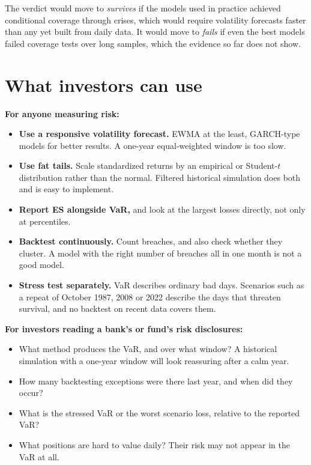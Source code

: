 The verdict would move to \emph{survives} if the models used in practice achieved conditional coverage through crises, which would require volatility forecasts faster than any yet built from daily data. It would move to \emph{fails} if even the best models failed coverage tests over long samples, which the evidence so far does not show.

\section{What investors can use}
\label{sec:15-investors}

\textbf{For anyone measuring risk:}

\begin{itemize}
  \item \textbf{Use a responsive volatility forecast.} EWMA at the least, GARCH-type models for better results. A one-year equal-weighted window is too slow.
  \item \textbf{Use fat tails.} Scale standardized returns by an empirical or Student-$t$ distribution rather than the normal. Filtered historical simulation does both and is easy to implement.
  \item \textbf{Report ES alongside VaR,} and look at the largest losses directly, not only at percentiles.
  \item \textbf{Backtest continuously.} Count breaches, and also check whether they cluster. A model with the right number of breaches all in one month is not a good model.
  \item \textbf{Stress test separately.} VaR describes ordinary bad days. Scenarios such as a repeat of October 1987, 2008 or 2022 describe the days that threaten survival, and no backtest on recent data covers them.
\end{itemize}

\textbf{For investors reading a bank's or fund's risk disclosures:}

\begin{itemize}
  \item What method produces the VaR, and over what window? A historical simulation with a one-year window will look reassuring after a calm year.
  \item How many backtesting exceptions were there last year, and when did they occur?
  \item What is the stressed VaR or the worst scenario loss, relative to the reported VaR?
  \item What positions are hard to value daily? Their risk may not appear in the VaR at all.
\end{itemize}

